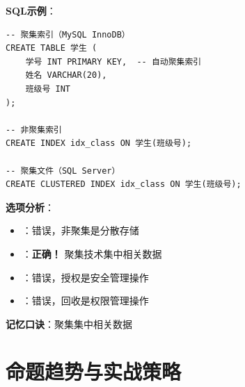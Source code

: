 \documentclass[12pt, a4paper]{article}
\newenvironment{bluebox}[1]{%
  \begin{trivlist}
  \item[\hskip\labelsep \textbf{#1}]
  \setlength{\parskip}{0.5ex}
  \setlength{\itemsep}{0.5ex}
}{%
  \end{trivlist}
  }
\begin{document}
\begin{bluebox}{例题13：聚集存储}
	\textbf{SQL示例}：
	\begin{verbatim}
-- 聚集索引（MySQL InnoDB）
CREATE TABLE 学生 (
    学号 INT PRIMARY KEY,  -- 自动聚集索引
    姓名 VARCHAR(20),
    班级号 INT
);

-- 非聚集索引
CREATE INDEX idx_class ON 学生(班级号);

-- 聚集文件（SQL Server）
CREATE CLUSTERED INDEX idx_class ON 学生(班级号);
	\end{verbatim}

	\textbf{选项分析}：
	\begin{itemize}[nosep]
		\item[A) 非聚集]：错误，非聚集是分散存储
		\item[B) 聚集]：\textbf{正确！} 聚集技术集中相关数据
		\item[C) 授权]：错误，授权是安全管理操作
		\item[D) 回收]：错误，回收是权限管理操作
	\end{itemize}

	\textbf{记忆口诀}：聚集集中相关数据
\end{bluebox}

\section{命题趋势与实战策略}
\end{document}
